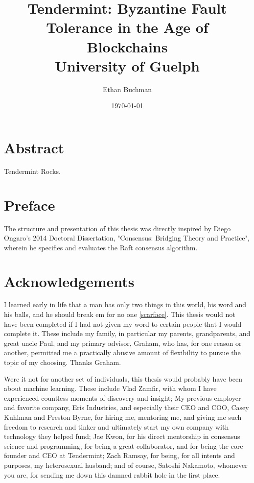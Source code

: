 \documentclass[12pt]{report}
\begin{document}
\title{
	{Tendermint: Byzantine Fault Tolerance in the Age of Blockchains}\\
	{\large University of Guelph}\\
}

\author{Ethan Buchman}
\date{\today}

\maketitle

\clearpage
\thispagestyle{plain}
\par\vspace*{.35\textheight}{\centering Dedicated to Theda. \par}

\chapter*{Abstract}
Tendermint Rocks.

\chapter*{Preface}
The structure and presentation of this thesis was directly inspired by Diego Ongaro's 2014 Doctoral Dissertation, 
"Consensus: Bridging Theory and Practice", wherein he specifies and evaluates the Raft consensus algorithm.

\chapter*{Acknowledgements}
I learned early in life that a man has only two things in this world, his word and his balls, and he should break em for no one \ref{scarface}. 
This thesis would not have been completed if I had not given my word to certain people that I would complete it.
These include my family, in particular my parents, grandparents, and great uncle Paul, and my primary advisor, Graham,
who has, for one reason or another, permitted me a practically abusive amount of flexibility to pursue the topic of my choosing.
Thanks Graham.

Were it not for another set of individuals, this thesis would probably have been about machine learning.
These include Vlad Zamfir, with whom I have experienced countless moments of discovery and insight;
My previous employer and favorite company, Eris Industries, and especially their CEO and COO, Casey Kuhlman and Preston Byrne,
for hiring me, mentoring me, and giving me such freedom to research and tinker and ultimately start my own company with technology they helped fund;
Jae Kwon, for his direct mentorship in consensus science and programming, for being a great collaborator, and for being the core founder and CEO at Tendermint;
Zach Ramsay, for being, for all intents and purposes, my heterosexual husband;
and of course, Satoshi Nakamoto, whomever you are, for sending me down this damned rabbit hole in the first place.
\end{document}
